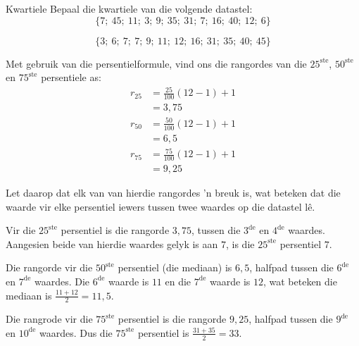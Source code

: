 
\begin{wex}{Kwartiele}
{Bepaal die kwartiele van die volgende datastel:
    \begin{equation*}
      \{7;\ 45;\ 11;\ 3;\ 9;\ 35;\ 31;\ 7;\ 16;\ 40;\ 12;\ 6\}
    \end{equation*}
}{
    \begin{equation*}
      \{3;\ 6;\ 7;\ 7;\ 9;\ 11;\ 12;\ 16;\ 31;\ 35;\ 40;\ 45\}
    \end{equation*}


    Met gebruik van die persentielformule, vind ons die rangordes van die $25^{\mathrm{ste}}$,
    $50^{\mathrm{ste}}$ en $75^{\mathrm{ste}}$ persentiele as:
    \begin{align*}
      r_{25} &= \frac{25}{100}\left(12-1\right)+1 \\
            &= 3,75 \\
      r_{50} &= \frac{50}{100}\left(12-1\right)+1 \\
            &= 6,5 \\
      r_{75} &= \frac{75}{100}\left(12-1\right)+1 \\
            &= 9,25
    \end{align*}


    Let daarop dat elk van van hierdie rangordes ’n breuk is, wat beteken dat die waarde vir elke persentiel iewers tussen twee waardes op die datastel lê. 

    Vir die $25^{\mathrm{ste}}$ persentiel is die rangorde $3,75$, tussen die $3^{\mathrm{de}}$ en $4^{\mathrm{de}}$ waardes. Aangesien beide van hierdie waardes gelyk is aan 
    $7$, is die $25^{\mathrm{ste}}$ persentiel $7$.

    Die rangorde vir die $50^{\mathrm{ste}}$ persentiel (die mediaan) is $6,5$, halfpad tussen die  $6^{\mathrm{de}}$ en $7^{\mathrm{de}}$ waardes. Die $6^{\mathrm{de}}$ waarde is
    $11$ en die $7^{\mathrm{de}}$ waarde is $12$, wat beteken die mediaan is
    \(\frac{11+12}{2} = 11,5\).

    Die rangrode vir die $75^{\mathrm{ste}}$ persentiel is die rangorde $9,25$, halfpad tussen die
    $9^{\mathrm{de}}$ en $10^{\mathrm{de}}$ waardes. Dus die $75^{\mathrm{ste}}$ persentiel is
    \(\frac{31+35}{2} = 33\).
  }
\end{wex}
